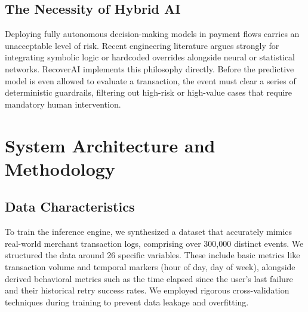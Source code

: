 \documentclass[conference]{IEEEtran}
\begin{document}
\subsection{The Necessity of Hybrid AI}
Deploying fully autonomous decision-making models in payment flows carries an unacceptable level of risk. Recent engineering literature \cite{ref4} argues strongly for integrating symbolic logic or hardcoded overrides alongside neural or statistical networks. RecoverAI implements this philosophy directly. Before the predictive model is even allowed to evaluate a transaction, the event must clear a series of deterministic guardrails, filtering out high-risk or high-value cases that require mandatory human intervention.

\section{System Architecture and Methodology}

\subsection{Data Characteristics}
To train the inference engine, we synthesized a dataset that accurately mimics real-world merchant transaction logs, comprising over 300,000 distinct events. We structured the data around 26 specific variables. These include basic metrics like transaction volume and temporal markers (hour of day, day of week), alongside derived behavioral metrics such as the time elapsed since the user's last failure and their historical retry success rates. We employed rigorous cross-validation techniques during training to prevent data leakage and overfitting.
\end{document}
